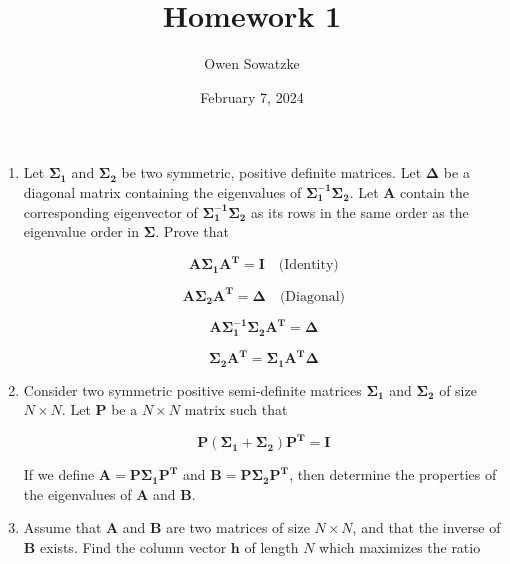 \documentclass[fleqn]{article}
\title{Homework 1}
\author{Owen Sowatzke}
\date{February 7, 2024}
\newcommand{\zerodisplayskip}{
	\setlength{\abovedisplayskip}{0pt}%
	\setlength{\belowdisplayskip}{0pt}%
	\setlength{\abovedisplayshortskip}{0pt}%
	\setlength{\belowdisplayshortskip}{0pt}%
	\setlength{\mathindent}{0pt}}
\begin{document}
	\offinterlineskip
	\setlength{\lineskip}{12pt}
	\zerodisplayskip
	\maketitle
	
	\begin{enumerate}
		\item Let $\mathbf{\Sigma_1}$ and $\mathbf{\Sigma_2}$ be two symmetric, positive definite matrices. Let $\mathbf{\Delta}$ be a diagonal matrix containing the eigenvalues of $\mathbf{\Sigma_1^{-1}}\mathbf{\Sigma_2}$. Let $\mathbf{A}$ contain the corresponding eigenvector of $\mathbf{\Sigma_1^{-1}}\mathbf{\Sigma_2}$ as its rows in the same order as the eigenvalue order in $\mathbf{\Sigma}$. Prove that
		
		\begin{equation*}
			\mathbf{A\Sigma_1A^T} = \mathbf{I}\quad\text{(Identity)}
		\end{equation*}
		
		\begin{equation*}
			\mathbf{A\Sigma_2A^T} = \mathbf{\Delta}\quad\text{(Diagonal)}
		\end{equation*}
		
		\begin{equation*}
			\mathbf{A\Sigma_1^{-1}\Sigma_2A^T = \Delta}
		\end{equation*}
		
		\begin{equation*}
			\mathbf{\Sigma_2A^T = \Sigma_1A^T\Delta}
		\end{equation*}
		
		\item Consider two symmetric positive semi-definite matrices $\mathbf{\Sigma_1}$ and $\mathbf{\Sigma_2}$ of size $N \times N$. Let $\mathbf{P}$ be a $N \times N$ matrix such that
		
		\begin{equation*}
			\mathbf{P}(\mathbf{\Sigma_1} + \mathbf{\Sigma_2})\mathbf{P^T} = \mathbf{I}
		\end{equation*}
		
		If we define $\mathbf{A} = \mathbf{P}\mathbf{\Sigma_1}\mathbf{P^T}$ and $\mathbf{B} = \mathbf{P}\mathbf{\Sigma_2}\mathbf{P^T}$, then determine the properties of the eigenvalues of $\mathbf{A}$ and $\mathbf{B}$.
		
		\item Assume that $\mathbf{A}$ and $\mathbf{B}$ are two matrices of size $N \times N$, and that the inverse of $\mathbf{B}$ exists. Find the column vector $\mathbf{h}$ of length $N$ which maximizes the ratio
		

\end{enumerate}
\end{document}
